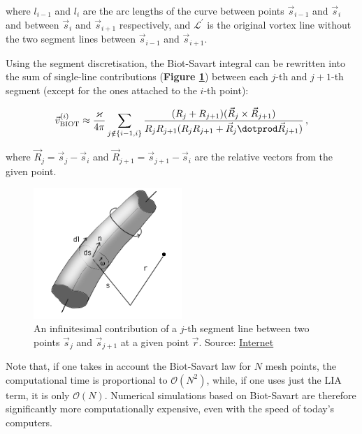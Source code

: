 where $l_{i-1}$ and $l_i$ are the arc lengths of the curve between
points $\vec{s}_{i-1}$ and $\vec{s}_i$ and between $\vec{s}_i$ and $\vec{s}_{i+1}$ respectively, and $\mathcal{L}^{\prime}$ is the original vortex line without the two segment lines between $\vec{s}_{i-1}$ and $\vec{s}_{i+1}$.

Using the segment discretisation, the Biot-Savart integral can be rewritten \cite{samuels} into the sum of single-line contributions (\textbf{Figure \ref{element}}) between each $j$-th and $j+1$-th segment (except for the ones attached to the $i$-th point):

\begin{equation}
\vec{v}_{\text{BIOT}}^{(i)} \approx
\frac{\varkappa}{4\pi}
\sum_{j \notin \{i-1, i\}}
\frac{(R_j + R_{j+1}) (\vec{R}_j \times \vec{R}_{j+1})}{R_j R_{j+1} (R_j R_{j+1} + \vec{R}_j \dotprod \vec{R}_{j+1})}\,,
\end{equation}

where $\vec{R}_j = \vec{s}_j - \vec{s}_i$ and $\vec{R}_{j+1} = \vec{s}_{j+1} - \vec{s}_i$ are the relative vectors from the given point.

\begin{figure}[h]
	\centering
	\includegraphics[width=0.5\textwidth]{graphics/simul/biot}
	\caption{An infinitesimal contribution of a $j$-th segment line between two points $\vec{s}_j$ and $\vec{s}_{j+1}$ at a given point $\vec{r}$. Source: \href{http://docs.desktop.aero/appliedaero/potential3d/BiotSavart.html}{Internet}}
	\label{element}
\end{figure}

Note that, if one takes in account the Biot-Savart law for $N$ mesh points, the computational time is proportional to $\mathcal{O}(N^2)$, while, if one uses just the LIA term, it is only $\mathcal{O}(N)$. Numerical simulations based on Biot-Savart are therefore significantly more computationally expensive, even with the speed of today's computers.

